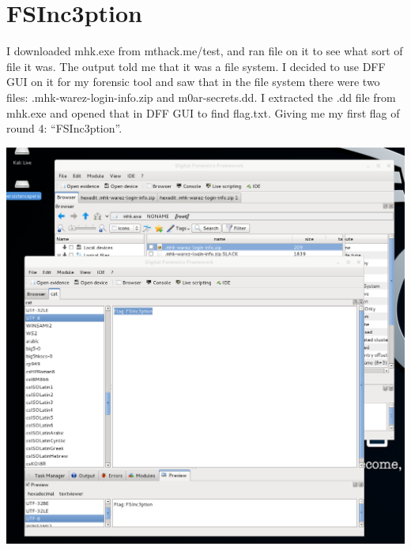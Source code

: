 \documentclass[12pt]{report}
\begin{document}
\section{FSInc3ption}
I downloaded mhk.exe from mthack.me/test, and ran file on it to see what sort of file it was. The output told me that it was a file system. I decided to use DFF GUI on it for my forensic tool and saw that in the file system there were two files: .mhk-warez-login-info.zip and m0ar-secrets.dd. I extracted the .dd file from mhk.exe and opened that in DFF GUI to find flag.txt. Giving me my first flag of round 4: ``FSInc3ption''.\\
\newline
\begin{center}
\includegraphics[scale=0.33]{FSInc3ption.png}
\end{center}
\end{document}
